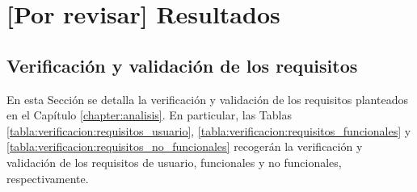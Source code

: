 \chapter{[Por revisar] Resultados}
\label{chapter:resultados}


\section{Verificación y validación de los requisitos}

    En esta Sección se detalla la verificación y validación de los requisitos planteados en el Capítulo \ref{chapter:analisis}. En particular, las Tablas \ref{tabla:verificacion:requisitos_usuario}, \ref{tabla:verificacion:requisitos_funcionales} y \ref{tabla:verificacion:requisitos_no_funcionales} recogerán la verificación y validación de los requisitos de usuario, funcionales y no funcionales, respectivamente.

